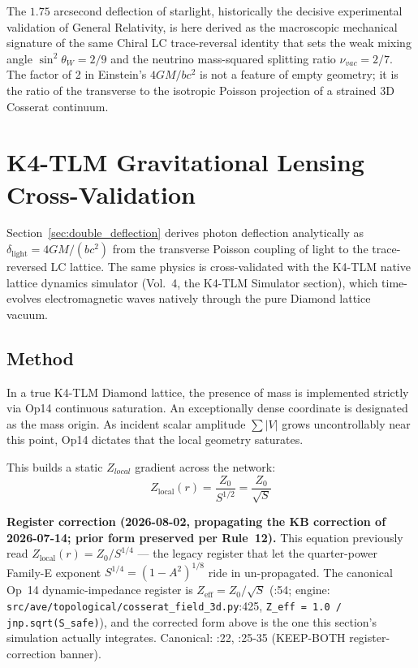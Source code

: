 The $1.75$ arcsecond deflection of starlight, historically the decisive experimental validation of General Relativity, is here derived as the macroscopic mechanical signature of the same Chiral LC trace-reversal identity that sets the weak mixing angle $\sin^2\theta_W = 2/9$ and the neutrino mass-squared splitting ratio $\nu_{vac} = 2/7$. The factor of 2 in Einstein's $4GM/bc^2$ is not a feature of empty geometry; it is the ratio of the transverse to the isotropic Poisson projection of a strained 3D Cosserat continuum.

\section{K4-TLM Gravitational Lensing Cross-Validation}
\label{sec:k4_tlm_lensing}

Section~\ref{sec:double_deflection} derives photon deflection analytically as $\delta_{\text{light}} = 4GM/(bc^2)$ from the transverse Poisson coupling of light to the trace-reversed LC lattice. The same physics is cross-validated with the K4-TLM native lattice dynamics simulator (Vol.~4, the K4-TLM Simulator section), which time-evolves electromagnetic waves natively through the pure Diamond lattice vacuum.

\subsection{Method}

In a true K4-TLM Diamond lattice, the presence of mass is implemented strictly via Op14 continuous saturation. An exceptionally dense coordinate is designated as the mass origin. As incident scalar amplitude $\sum|V|$ grows uncontrollably near this point, Op14 dictates that the local geometry saturates. 

This builds a static $Z_{local}$ gradient across the network:
\begin{equation}
    Z_{\text{local}}(r) = \frac{Z_0}{S^{1/2}} = \frac{Z_0}{\sqrt{S}}
\end{equation}

\noindent\textbf{Register correction (2026-08-02, propagating the KB
correction of 2026-07-14; prior form preserved per Rule~12).} This equation
previously read $Z_{\text{local}}(r) = Z_0/S^{1/4}$ --- the legacy register
that let the quarter-power Family-E exponent $S^{1/4} = (1 - A^2)^{1/8}$ ride
in un-propagated. The canonical Op~14 dynamic-impedance register is
$Z_{\text{eff}} = Z_0/\sqrt{S}$
(:54; engine:
\texttt{src/ave/topological/cosserat\_field\_3d.py}:425, \texttt{Z\_eff =
1.0 / jnp.sqrt(S\_safe)}), and the corrected form above is the one this
section's simulation actually integrates. Canonical:
:22,
:25-35 (KEEP-BOTH register-correction banner).

